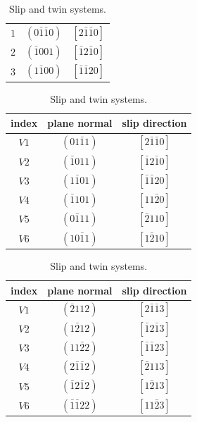 \begin{table}[H]
\begin{minipage}[h]{0.45\textwidth}
\begin{subtable}{\textwidth}
\begin{tabular}{ccc}
            \hline
            $1$ & $(0 \bar{1} \bar{1} 0)$ & $[ 2 \bar{1} \bar{1} 0]$ \\
            $2$ & $(\bar{1} 0 0 1)$ & $[ \bar{1} 2 \bar{1} 0]$ \\
            $3$ & $(1 \bar{1} 0 0)$ & $[ \bar{1} \bar{1} 2 0]$ \\
            \hline
        \end{tabular}
    \end{subtable}    
    \end{minipage}%
    \hfill
    \begin{minipage}[t]{0.45\textwidth}
    \begin{subtable}{\textwidth}
    \centering
    \caption{$\langle 2 \bar{1} \bar{1} 0 \rangle \{ 0 1 \Bar{1} 1 \}$ 1st  order pyramidal slip system.}
    \label{tab:Slips2}
        \begin{tabular}{ccc}
            \hline
            index & plane normal & slip direction \\
            \hline
            $V1$ & $(0 1 \bar{1} 1)$ & $[ 2 \bar{1} \bar{1} 0]$ \\
            $V2$ & $(\bar{1} 0 1 1)$ & $[ \bar{1} 2 \bar{1} 0]$ \\
            $V3$ & $(1 \bar{1} 0 1)$ & $[ \bar{1} \bar{1} 2 0]$ \\
            $V4$ & $(\bar{1} 1 0 1)$ & $[ 1 1 \bar{2} 0]$ \\
            $V5$ & $(0 \bar{1} 1 1)$ & $[ \bar{2} 1 1 0]$ \\
            $V6$ & $(1 0 \bar{1} 1)$ & $[ 1 \bar{2} 1 0]$ \\
            \hline
        \end{tabular}
    \end{subtable} 
    \begin{subtable}{\textwidth}
    \centering
    \caption{$\langle 2 \bar{1} \bar{1} 3 \rangle \{ \bar{2} 1 1 2\}$ 2nd  order pyramidal slip system.}
    \label{tab:Slips3}
        \begin{tabular}{ccc}
            \hline
            index & plane normal & slip direction \\
            \hline
            $V1$ & $(\bar{2} 1 1 2)$ & $[ 2 \bar{1} \bar{1} 3]$ \\
            $V2$ & $(1 \bar{2} 1 2)$ & $[ \bar{1} 2 \bar{1} 3]$ \\
            $V3$ & $(1 1 \bar{2} 2)$ & $[ \bar{1} \bar{1} 2 3]$ \\
            $V4$ & $(2 \bar{1} \bar{1} 2)$ & $[ \bar{2} 1 1 3]$ \\
            $V5$ & $(\bar{1} 2 \bar{1} 2)$ & $[ 1 \bar{2} 1 3]$ \\
            $V6$ & $(\bar{1} \bar{1} 2 2)$ & $[ 1 1 \bar{2} 3]$ \\
            \hline
        \end{tabular}
    \end{subtable}
    \end{minipage}
    \caption{Slip and twin systems.}
    \label{tab:Crystallography}
    
\end{table}

